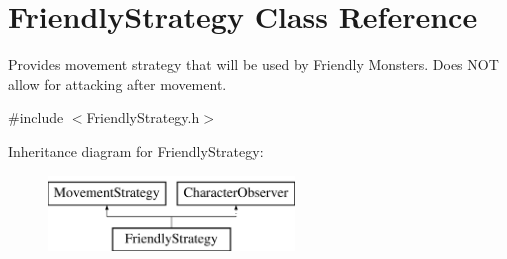 \hypertarget{class_friendly_strategy}{}\section{Friendly\+Strategy Class Reference}
\label{class_friendly_strategy}


Provides movement strategy that will be used by Friendly Monsters. Does N\+OT allow for attacking after movement.  




{\ttfamily \#include $<$Friendly\+Strategy.\+h$>$}

Inheritance diagram for Friendly\+Strategy\+:\begin{figure}[H]
\begin{center}
\leavevmode
\includegraphics[height=2.000000cm]{class_friendly_strategy}
\end{center}
\end{figure}
